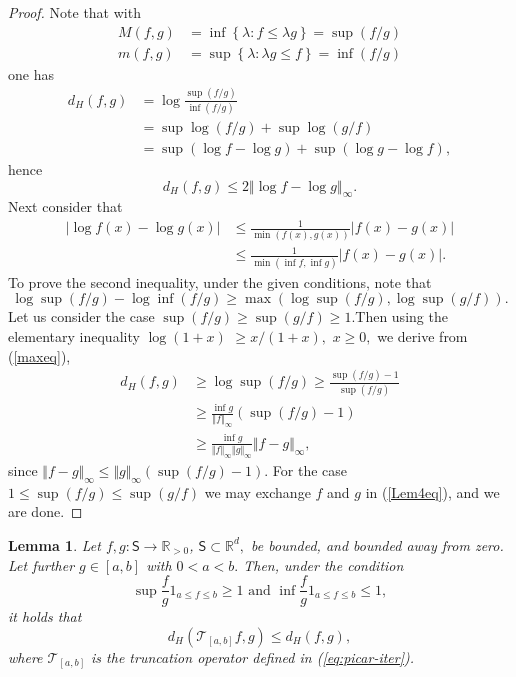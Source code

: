 \documentclass[a4paper,11pt]{amsart}
\theoremstyle{plain}
\newtheorem{lemma}[theorem]{Lemma}
\theoremstyle{remark}
\begin{document}
\begin{proof}
Note that with%
\begin{align*}
M(f,g) &  =\inf\left\{  \lambda:f\leq\lambda g\right\}  =\sup\left(
f/g\right)  \\
m(f,g) &  =\sup\left\{  \lambda:\lambda g\leq f\right\}  =\inf\left(
f/g\right)
\end{align*}
one has%
\begin{align*}
d_{H}(f,g) &  =\log\frac{\sup\left(  f/g\right)  }{\inf\left(  f/g\right)  }\\
&  =\sup\log\left(  f/g\right)  +\sup\log\left(  g/f\right)  \\
&  =\sup\left(  \log f-\log g\right)  +\sup\left(  \log g-\log f\right)  ,
\end{align*}
hence%
\[
d_{H}(f,g)\leq2\left\Vert \log f-\log g\right\Vert _{\infty}.
\]
Next consider that%
\begin{align*}
\left\vert \log f(x)-\log g(x)\right\vert  &  \leq\frac{1}{\min(f(x),g(x))}%
\left\vert f(x)-g(x)\right\vert \\
&  \leq\frac{1}{\min(\inf f,\inf g)}\left\vert f(x)-g(x)\right\vert .
\end{align*}
To prove the second inequality, under the given conditions, note that 
\begin{equation}
\log\sup(f/g)-\log\inf(f/g)\geq\max(\log\sup(f/g),\log\sup(g/f)).\label{maxeq}%
\end{equation}
Let us consider the case $\sup(f/g)\geq\sup(g/f)\geq1.$Then using the
elementary inequality $\log(1+x)$ $\geq x/(1+x),$ $x\geq0,$ we derive from
(\ref{maxeq}),
\begin{align}
d_{H}(f,g)  & \geq\log\sup(f/g)\geq\frac{\sup(f/g)-1}{\sup(f/g)}\nonumber\\
& \geq\frac{\inf g}{\Vert f\Vert_{\infty}}\left(  \sup(f/g)-1\right)
\nonumber\\
& \geq\frac{\inf g}{\Vert f\Vert_{\infty}\Vert g\Vert_{\infty}}\Vert
f-g\Vert_{\infty},\label{Lem4eq}%
\end{align}
since $\Vert f-g\Vert_{\infty}\leq\Vert g\Vert_{\infty}(\sup(f/g)-1).$ For the
case $1\leq\sup(f/g)\leq\sup(g/f)$ we may exchange $f$ and $g$ in
(\ref{Lem4eq}), and we are done.
\end{proof}


\begin{lemma}\label{Dhineq}
Let $f,g:\mathsf{S}\rightarrow\mathbb{R}_{>0}$, $\mathsf{S}\subset\mathbb{R}^{d},$ be bounded,
and bounded away from zero. Let further $g\in\left[  a,b\right]  $ with
$0<a<b.$ Then, under the condition%
\begin{equation}
\sup\frac{f}{g}1_{a\leq f\leq b}\geq1\text{ \ \ and \ }\inf\frac{f}{g}1_{a\leq
f\leq b}\leq1,\label{Hmcon}%
\end{equation}
it holds that%
\begin{equation}
d_{H}(\mathcal{T}_{\left[  a,b\right]  }f,g)\leq d_{H}(f,g),\label{Hmineq}%
\end{equation}
where $\mathcal{T}_{\left[  a,b\right]  }$ is the truncation operator defined
in (\ref{eq:picar-iter}). 
\end{lemma}
\end{document}
